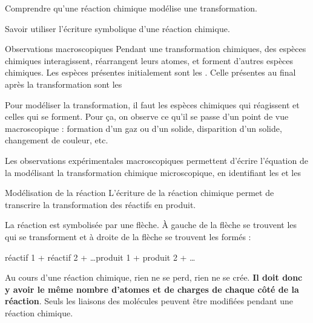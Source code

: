 \teteSndChim

\vspace*{-40pt}

\begin{objectifs}
  \item Comprendre qu'une réaction chimique modélise une transformation.
  \item Savoir utiliser l'écriture symbolique d'une réaction chimique.
\end{objectifs}

  


\begin{doc}{Observations macroscopiques}
  Pendant une transformation chimiques, des espèces chimiques interagissent, réarrangent leurs atomes, et forment d'autres espèces chimiques.
  Les espèces présentes initialement sont les . Celle présentes au final après la transformation sont les 
  
  Pour modéliser la transformation, il faut  les espèces chimiques qui réagissent et celles qui se forment.
  Pour ça, on observe ce qu'il se passe d'un point de vue macroscopique : formation d'un gaz ou d'un solide, disparition d'un solide, changement de couleur, etc.
  
  \begin{encart}
    Les observations expérimentales macroscopiques permettent d'écrire l'équation de la  modélisant la transformation chimique microscopique, en identifiant les  et les 
  \end{encart}
\end{doc}

\begin{doc}{Modélisation de la réaction}
  L'écriture de la réaction chimique permet de transcrire la transformation des réactifs en produit.
  
  \begin{encart}
    La réaction est symbolisée par une flèche. À gauche de la flèche se trouvent les  qui se transforment et à droite de la flèche se trouvent les  formés :
    \begin{center}
      réactif 1 + réactif 2 + \ldots \reaction produit 1 + produit 2 + \ldots
    \end{center}
  \end{encart}
  
  Au cours d'une réaction chimique, rien ne se perd, rien ne se crée. \textbf{Il doit donc y avoir le même nombre d'atomes et de charges de chaque côté de la réaction}.
  Seuls les liaisons des molécules peuvent être modifiées pendant une réaction chimique.
\end{doc}

